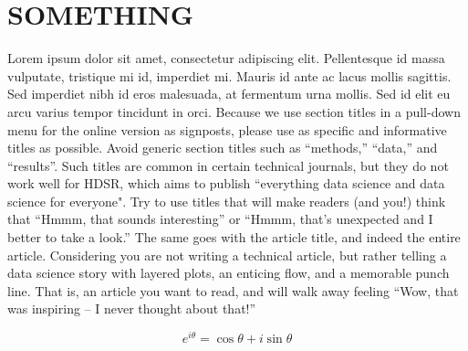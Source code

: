 \documentclass[]{hdsr}
\begin{document}
\section{SOMETHING}
\label{appendix-customize-this-label}
Lorem ipsum dolor sit amet, consectetur adipiscing elit. Pellentesque id massa vulputate, tristique mi id, imperdiet mi. Mauris id ante ac lacus mollis sagittis. Sed imperdiet nibh id eros malesuada, at fermentum urna mollis. Sed id elit eu arcu varius tempor tincidunt in orci. Because we use section titles in a pull-down menu for the online version as signposts, please use as specific and informative titles as possible. Avoid generic section titles such as ``methods,'' ``data,'' and ``results''. Such titles are common in certain technical journals, but they do not work well for HDSR, which aims to publish ``everything data science and data science for everyone". Try to use titles that will make readers (and you!) think that ``Hmmm, that sounds interesting'' or ``Hmmm, that's unexpected and I better to take a look.''   The same goes with the article title, and indeed the entire article.  Considering you are not writing a technical article, but rather telling a data science story with layered plots, an enticing flow, and a memorable punch line. That is, an article you want to read, and will walk away feeling ``Wow, that was inspiring -- I never thought about that!'' 

\begin{equation}
e^{i\theta} = \cos \theta + i\sin \theta
\end{equation}
\end{document}
